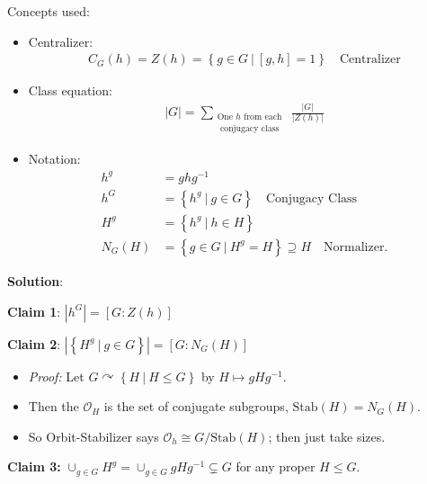 \begin{solution}

Concepts used:

\begin{itemize}
\tightlist
\item
  Centralizer:
  \begin{align*}
  C_G(h) = Z(h) = \left\{{g\in G {~\mathrel{\Big|}~}[g,h] = 1}\right\}
  \quad\text{Centralizer}
  \end{align*}
\item
  Class equation:
  \begin{align*}
  {\left\lvert {G} \right\rvert} = \sum_{\substack{\text{One $h$ from each } \\ \text{ conjugacy class}}} \frac{{\left\lvert {G} \right\rvert}}{{\left\lvert {Z(h)} \right\rvert}}
  \end{align*}
\item
  Notation:
  \begin{align*}
  h^g &= ghg^{-1}\\
  h^G &= \left\{{ h^g {~\mathrel{\Big|}~}g\in G}\right\} \quad\text{Conjugacy Class}\\
  H^g &= \left\{{h^g {~\mathrel{\Big|}~}h\in H}\right\} \\
  N_G(H) &= \left\{{g\in G {~\mathrel{\Big|}~}H^g = H}\right\} \supseteq H \quad\text{Normalizer}
  .\end{align*}
\end{itemize}

\textbf{Solution}:

\textbf{Claim 1}: \({\left\lvert {h^G} \right\rvert} = [G: Z(h)]\)

\textbf{Claim 2}:
\({\left\lvert {\left\{{H^g {~\mathrel{\Big|}~}g\in G}\right\}} \right\rvert} = [G: N_G(H)]\)

\begin{itemize}
\tightlist
\item
  \emph{Proof:} Let
  \(G\curvearrowright\left\{{H {~\mathrel{\Big|}~}H \leq G}\right\}\) by
  \(H \mapsto gHg^{-1}\).
\item
  Then the \(\mathcal O_H\) is the set of conjugate subgroups,
  \(\mathrm{Stab}(H) = N_G(H)\).
\item
  So Orbit-Stabilizer says \(\mathcal O_h \cong G/\mathrm{Stab}(H)\);
  then just take sizes.
\end{itemize}

\textbf{Claim 3:}
\(\cup_{g\in G} H^g = \cup_{g\in G} gHg^{-1}\subsetneq G\) for any
proper \(H \leq G\).


\end{solution}
